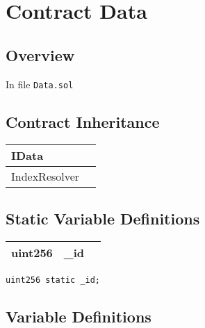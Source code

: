 
\chapter{Contract Data}

\minitoc

\section{Overview}


In file {\tt Data.sol}

\section{Contract Inheritance}


\noindent\begin{tabular}{|l|p{5cm}|}\hline
IData & \\\hline
IndexResolver & \\\hline
\end{tabular}


\section{Static Variable Definitions}


\ifsoltables
\noindent\begin{tabular}{|l|l|p{5cm}|}\hline
uint256 & \_{}id &  \\\hline
\end{tabular}
\fi


\begin{lstlisting}[firstnumber=18]
    uint256 static _id;
\end{lstlisting}

\section{Variable Definitions}


